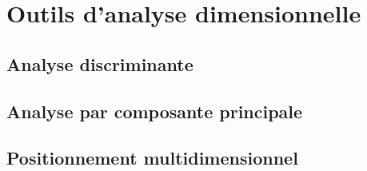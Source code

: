 \chapter{Outils d'analyse dimensionnelle}
\label{app:statmulti}

\section{Analyse discriminante}

\section{Analyse par composante principale}

\section{Positionnement multidimensionnel}

